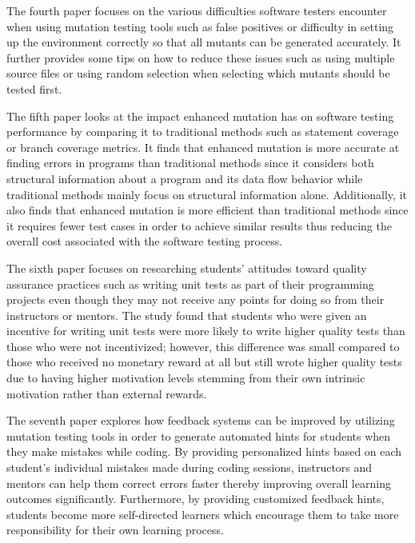 The fourth paper focuses on the various difficulties software testers encounter when using mutation testing tools such as false positives or difficulty in setting up the environment correctly so that all mutants can be generated accurately. It further provides some tips on how to reduce these issues such as using multiple source files or using random selection when selecting which mutants should be tested first.  \par

The fifth paper looks at the impact enhanced mutation has on software testing performance by comparing it to traditional methods such as statement coverage or branch coverage metrics. It finds that enhanced mutation is more accurate at finding errors in programs than traditional methods since it considers both structural information about a program and its data flow behavior while traditional methods mainly focus on structural information alone. Additionally, it also finds that enhanced mutation is more efficient than traditional methods since it requires fewer test cases in order to achieve similar results thus reducing the overall cost associated with the software testing process.  \par

The sixth paper focuses on researching students’ attitudes toward quality assurance practices such as writing unit tests as part of their programming projects even though they may not receive any points for doing so from their instructors or mentors. The study found that students who were given an incentive for writing unit tests were more likely to write higher quality tests than those who were not incentivized; however, this difference was small compared to those who received no monetary reward at all but still wrote higher quality tests due to having higher motivation levels stemming from their own intrinsic motivation rather than external rewards.  \par

The seventh paper explores how feedback systems can be improved by utilizing mutation testing tools in order to generate automated hints for students when they make mistakes while coding. By providing personalized hints based on each student’s individual mistakes made during coding sessions, instructors and mentors can help them correct errors faster thereby improving overall learning outcomes significantly. Furthermore, by providing customized feedback hints, students become more self-directed learners which encourage them to take more responsibility for their own learning process. \par  


